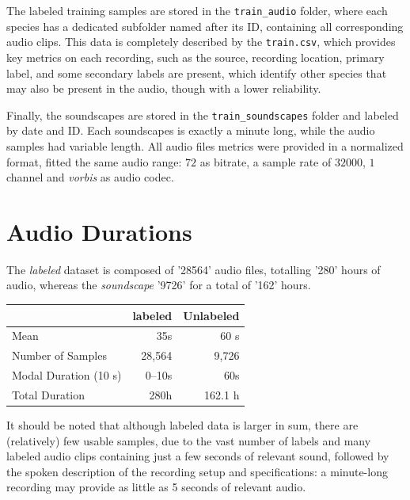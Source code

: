 \documentclass[10pt]{article}
\begin{document}
The labeled training samples are stored in the \texttt{train\_audio} folder, where each species has a dedicated subfolder named after its ID, containing all corresponding audio clips. This data is completely described by the \texttt{train.csv}, which provides key metrics on each recording, such as the source, recording location, primary label, and some secondary labels are present, which identify other species that may also be present in the audio, though with a lower reliability.

Finally, the soundscapes are stored in the \texttt{train\_soundscapes} folder and labeled by date and ID. Each soundscapes is exactly a minute long, while the audio samples had variable length. All audio files metrics were provided in a normalized format, fitted the same audio range: $72$ as bitrate, a sample rate of $32000$, $1$ channel and \textit{vorbis} as audio codec.

\section*{Audio Durations}

The \textit{labeled} dataset is composed of '28564' audio files, totalling '280' hours of audio, whereas the \textit{soundscape} '9726' for a total of '162' hours.

\begin{table}[h!]
  \centering
  \begin{tabular}{|l|r|r|}
    \hline
    & \textbf{labeled} & \textbf{Unlabeled} \\
    \hline
    Mean                  & 35s      & 60 s       \\
    Number of Samples      & 28,564   & 9,726      \\
    Modal Duration (10 s)  & 0--10s   & 60s        \\
    Total Duration         & 280h     & 162.1 h    \\
    \hline
  \end{tabular}
\end{table}

It should be noted that although labeled data is larger in sum, there are (relatively) few usable samples, due to the vast number of labels and many labeled audio clips containing just a few seconds of relevant sound, followed by the spoken description of the recording setup and specifications: a minute-long recording may provide as little as 5 seconds of relevant audio. 
\end{document}
